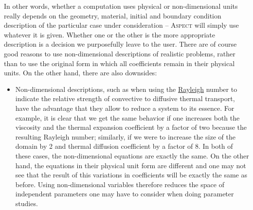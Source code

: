 \documentclass{article}
\newcommand{\aspect}{\textsc{Aspect}}
\begin{document}
In other words, whether a computation uses physical or non-dimensional units
really depends on the geometry, material, initial and boundary condition
description of the particular case under consideration -- \aspect{} will simply
use whatever it is given. Whether one or the other is the more appropriate
description is a decision we purposefully leave to the user. There are of
course good reasons to use non-dimensional descriptions of realistic problems,
rather than to use the original form in which all coefficients remain in their
physical units. On the other hand, there are also downsides:
\begin{itemize}
  \item Non-dimensional descriptions, such as when using the
  \href{http://en.wikipedia.org/wiki/Rayleigh_number}{Rayleigh} number to
  indicate the relative strength of convective to diffusive thermal transport,
  have the advantage that they allow to reduce a system to its essence. For
  example, it is clear that we get the same behavior if one increases both the
  viscosity and the thermal expansion coefficient by a factor of two because the
  resulting Rayleigh number; similarly, if we were to increase the size of the
  domain by 2 and thermal diffusion coefficient by a factor of 8. In both of
  these cases, the non-dimensional equations are exactly the same. On the other
  hand, the equations in their physical unit form are different and one may not
  see that the result of this variations in coefficients will be exactly the
  same as before. Using non-dimensional variables therefore reduces the space of
  independent parameters one may have to consider when doing parameter studies.


\end{itemize}
\end{document}
